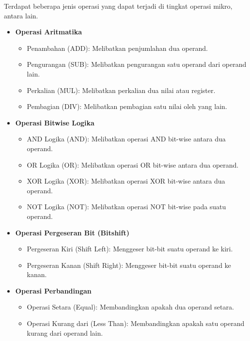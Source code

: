 Terdapat beberapa jenis operasi yang dapat terjadi di tingkat operasi mikro, antara lain.

\begin{itemize}

  \item \textbf{Operasi Aritmatika}
    \begin{itemize}
      \item Penambahan (ADD): Melibatkan penjumlahan dua operand.
      \item Pengurangan (SUB): Melibatkan pengurangan satu operand dari operand lain.
      \item Perkalian (MUL): Melibatkan perkalian dua nilai atau register.
      \item Pembagian (DIV): Melibatkan pembagian satu nilai oleh yang lain.
    \end{itemize}

  \item \textbf{Operasi Bitwise Logika}
    \begin{itemize}
      \item AND Logika (AND): Melibatkan operasi AND bit-wise antara dua operand.
      \item OR Logika (OR): Melibatkan operasi OR bit-wise antara dua operand.
      \item XOR Logika (XOR): Melibatkan operasi XOR bit-wise antara dua operand.
      \item NOT Logika (NOT): Melibatkan operasi NOT bit-wise pada suatu operand.
    \end{itemize}

  \item \textbf{Operasi Pergeseran Bit (Bitshift)}
    \begin{itemize}
      \item Pergeseran Kiri (Shift Left): Menggeser bit-bit suatu operand ke kiri.
      \item Pergeseran Kanan (Shift Right): Menggeser bit-bit suatu operand ke kanan.
    \end{itemize}

  \item \textbf{Operasi Perbandingan}
    \begin{itemize}
      \item Operasi Setara (Equal): Membandingkan apakah dua operand setara.
      \item Operasi Kurang dari (Less Than): Membandingkan apakah satu operand kurang dari operand lain.
    \end{itemize}


\end{itemize}
